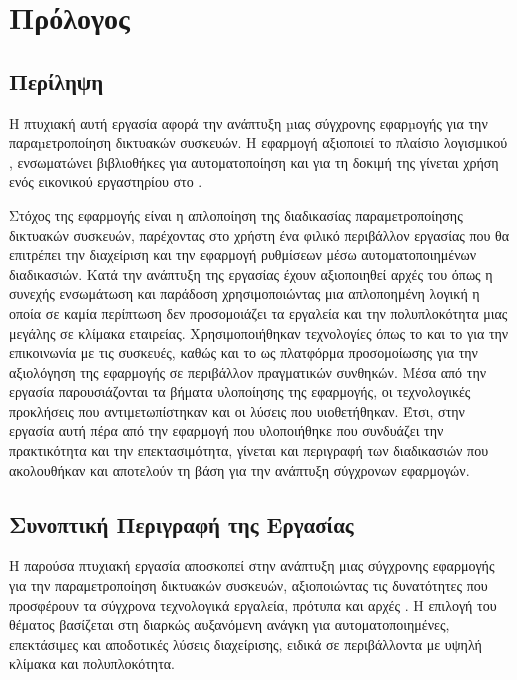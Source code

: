 \chapter{Πρόλογος}

\section{Περίληψη}

Η πτυχιακή αυτή εργασία αφορά την ανάπτυξη µιας σύγχρονης εφαρµογής 
για την παραµετροποίηση δικτυακών συσκευών. Η εφαρμογή αξιοποιεί το 
πλαίσιο λογισμικού , ενσωματώνει βιβλιοθήκες  
για αυτοματοποίηση και για τη δοκιμή της γίνεται χρήση ενός εικονικού
εργαστηρίου στο . 

Στόχος της εφαρμογής είναι η απλοποίηση 
της διαδικασίας παραμετροποίησης δικτυακών συσκευών, παρέχοντας στο 
χρήστη ένα φιλικό περιβάλλον εργασίας που θα επιτρέπει την 
διαχείριση και την εφαρμογή ρυθμίσεων μέσω αυτοματοποιημένων 
διαδικασιών. Κατά την ανάπτυξη της εργασίας έχουν αξιοποιηθεί αρχές 
του  όπως η συνεχής ενσωμάτωση και παράδοση  
χρησιμοποιώντας μια απλοποημένη λογική η οποία σε καμία περίπτωση 
δεν προσομοιάζει τα εργαλεία και την πολυπλοκότητα μιας μεγάλης σε κλίμακα εταιρείας. Χρησιμοποιήθηκαν τεχνολογίες όπως το  και το  για την επικοινωνία με τις συσκευές, καθώς και το  ως πλατφόρμα προσομοίωσης για την αξιολόγηση της εφαρμογής σε περιβάλλον πραγματικών συνθηκών.
Μέσα από την εργασία παρουσιάζονται τα βήματα υλοποίησης της 
εφαρμογής, οι τεχνολογικές προκλήσεις που αντιμετωπίστηκαν και 
οι λύσεις που υιοθετήθηκαν. Έτσι, στην εργασία αυτή πέρα από την 
εφαρμογή που υλοποιήθηκε που συνδυάζει την πρακτικότητα και την 
επεκτασιμότητα, γίνεται και περιγραφή των διαδικασιών που 
ακολουθήκαν και αποτελούν τη βάση για την ανάπτυξη σύγχρονων 
εφαρμογών.

\section{Συνοπτική Περιγραφή της Εργασίας}

Η παρούσα πτυχιακή εργασία αποσκοπεί στην ανάπτυξη μιας σύγχρονης 
εφαρμογής για την παραμετροποίηση δικτυακών συσκευών, αξιοποιώντας 
τις δυνατότητες που προσφέρουν τα σύγχρονα τεχνολογικά εργαλεία, 
πρότυπα και αρχές . 
Η επιλογή του θέματος βασίζεται στη διαρκώς αυξανόμενη ανάγκη 
για αυτοματοποιημένες, επεκτάσιμες και αποδοτικές λύσεις διαχείρισης, 
ειδικά σε περιβάλλοντα με υψηλή κλίμακα και πολυπλοκότητα.

